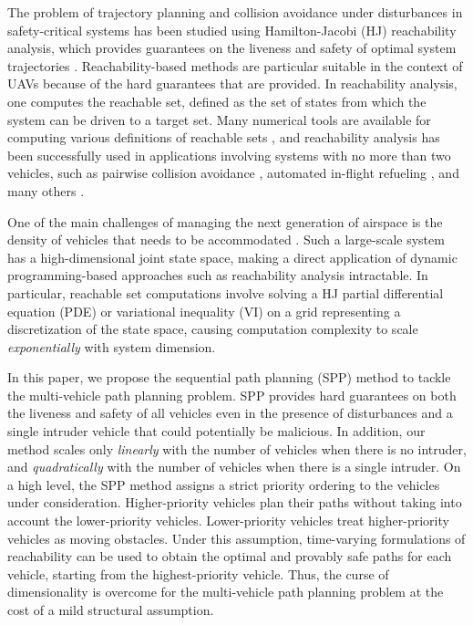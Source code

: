 The problem of trajectory planning and collision avoidance under disturbances in safety-critical systems has been studied using Hamilton-Jacobi (HJ) reachability analysis, which provides guarantees on the liveness and safety of optimal system trajectories \cite{Barron90, Mitchell05, Bokanowski10, Bokanowski11, Margellos11, Fisac15}. Reachability-based methods are particular suitable in the context of UAVs because of the hard guarantees that are provided. In reachability analysis, one computes the reachable set, defined as the set of states from which the system can be driven to a target set. Many numerical tools are available for computing various definitions of reachable sets \cite{Sethian96, Osher02, Mitchell02, Mitchell07b}, and reachability analysis has been successfully used in applications involving systems with no more than two vehicles, such as pairwise collision avoidance \cite{Mitchell05}, automated in-flight refueling \cite{Ding08}, and many others \cite{Huang11, Bayen07}.

One of the main challenges of managing the next generation of airspace is the density of vehicles that needs to be accommodated \cite{Kopardekar16}. Such a large-scale system has a high-dimensional joint state space, making a direct application of dynamic programming-based approaches such as reachability analysis intractable. In particular, reachable set computations involve solving a HJ partial differential equation (PDE) or variational inequality (VI) on a grid representing a discretization of the state space, causing computation complexity to scale \textit{exponentially} with system dimension.

In this paper, we propose the sequential path planning (SPP) method to tackle the multi-vehicle path planning problem. SPP provides hard guarantees on both the liveness and safety of all vehicles even in the presence of disturbances and a single intruder vehicle that could potentially be malicious. In addition, our method scales only \textit{linearly} with the number of vehicles when there is no intruder, and \textit{quadratically} with the number of vehicles when there is a single intruder. On a high level, the SPP method assigns a strict priority ordering to the vehicles under consideration. Higher-priority vehicles plan their paths without taking into account the lower-priority vehicles. Lower-priority vehicles treat higher-priority vehicles as moving obstacles. Under this assumption, time-varying formulations of reachability \cite{Bokanowski11, Fisac15} can be used to obtain the optimal and provably safe paths for each vehicle, starting from the highest-priority vehicle. Thus, the curse of dimensionality is overcome for the multi-vehicle path planning problem at the cost of a mild structural assumption. 

